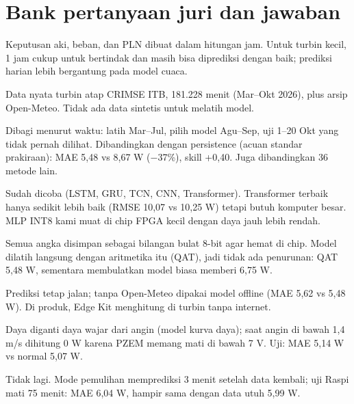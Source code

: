 \documentclass[10.5pt,a4paper]{article}
\begin{document}
\section{Bank pertanyaan juri dan jawaban}
\begin{jawab}
Keputusan aki, beban, dan PLN dibuat dalam hitungan jam. Untuk turbin kecil, 1 jam cukup untuk bertindak dan masih bisa diprediksi
dengan baik; prediksi harian lebih bergantung pada model cuaca.
\end{jawab}
\begin{jawab}
Data nyata turbin atap CRIMSE ITB, 181.228 menit (Mar--Okt 2026), plus arsip Open-Meteo. Tidak ada data sintetis untuk melatih model.
\end{jawab}
\begin{jawab}
Dibagi menurut waktu: latih Mar--Jul, pilih model Agu--Sep, uji 1--20 Okt yang tidak pernah dilihat. Dibandingkan dengan persistence
(acuan standar prakiraan): MAE 5,48 vs 8,67 W ($-$37\%), skill +0,40. Juga dibandingkan 36 metode lain.
\end{jawab}
\begin{jawab}
Sudah dicoba (LSTM, GRU, TCN, CNN, Transformer). Transformer terbaik hanya sedikit lebih baik (RMSE 10,07 vs 10,25 W) tetapi butuh
komputer besar. MLP INT8 kami muat di chip FPGA kecil dengan daya jauh lebih rendah.
\end{jawab}
\begin{jawab}
Semua angka disimpan sebagai bilangan bulat 8-bit agar hemat di chip. Model dilatih langsung dengan aritmetika itu (QAT), jadi tidak
ada penurunan: QAT 5,48 W, sementara membulatkan model biasa memberi 6,75 W.
\end{jawab}
\begin{jawab}
Prediksi tetap jalan; tanpa Open-Meteo dipakai model offline (MAE 5,62 vs 5,48 W). Di produk, Edge Kit menghitung di turbin tanpa internet.
\end{jawab}
\begin{jawab}
Daya diganti daya wajar dari angin (model kurva daya); saat angin di bawah 1,4 m/s dihitung 0 W karena PZEM memang mati di bawah 7 V.
Uji: MAE 5,14 W vs normal 5,07 W.
\end{jawab}
\begin{jawab}
Tidak lagi. Mode pemulihan memprediksi 3 menit setelah data kembali; uji Raspi mati 75 menit: MAE 6,04 W, hampir sama dengan data utuh 5,99 W.
\end{jawab}
\end{document}
